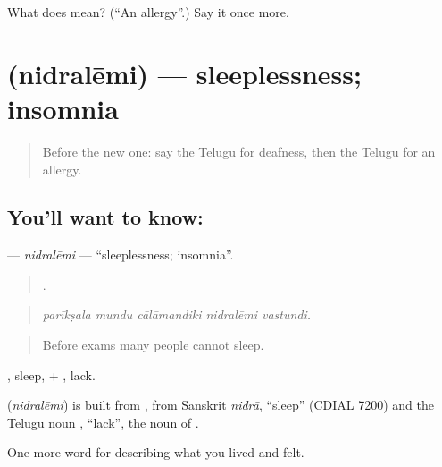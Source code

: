 \begin{tcolorbox}[breakable,colback=teal!4,colframe=teal!35!black,title={Before you move on}]
What does  mean? (\textquotedblleft{}An allergy\textquotedblright{}.) Say it once more.
\end{tcolorbox}
\section[\texorpdfstring{\te{నిద్రలేమి} (nidralēmi)}{నిద్రలేమి (nidralēmi)}]{ (nidralēmi) — sleeplessness; insomnia}

\label{lesson:TE-C516-nidralemi}



\begin{quote}
Before the new one: say the Telugu for deafness, then the Telugu for an allergy.
\end{quote}

\subsection*{You'll want to know: }
\textbf{} — \emph{nidralēmi} — \textquotedblleft{}sleeplessness; insomnia\textquotedblright{}.

\begin{quote}
    .
\end{quote}

\begin{quote}
\emph{parīkṣala mundu cālāmandiki nidralēmi vastundi.}
\end{quote}

\begin{quote}
Before exams many people cannot sleep.
\end{quote}

, sleep, + , lack.

\begin{cousinweb}
\textbf{} (\emph{nidralēmi}) is built from , from Sanskrit \emph{nidrā}, \textquotedblleft{}sleep\textquotedblright{} (CDIAL 7200) and the Telugu noun , \textquotedblleft{}lack\textquotedblright{}, the noun of .
\end{cousinweb}

\begin{grammarlens}[title={What you've built}]
One more word for describing what you lived and felt.
\end{grammarlens}

